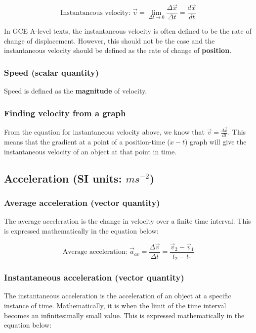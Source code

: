 \documentclass[11pt]{article}
\begin{document}
\[\text{Instantaneous velocity: } \vec{v} = \lim_{\Delta t \rightarrow 0} \frac{\Delta \vec{x}}{\Delta t} = \frac{d \vec{x}}{dt}\]

In GCE A-level texts, the instantaneous velocity is often defined to be the rate of change of displacement. However, this should not be the case and the instantaneous velocity should be defined as the rate of change of \textbf{position}.

\subsubsection{Speed (scalar quantity)}
\label{sec:org77fb81c}
Speed is defined as the \textbf{magnitude} of velocity.

\subsubsection{Finding velocity from a graph}
\label{sec:org76e28b6}
From the equation for instantaneous velocity above, we know that \(\vec{v} = \frac{d \vec{x}}{dt}\). This means that the gradient at a point of a position-time (\(x - t\)) graph will give the instantaneous velocity of an object at that point in time.


\subsection{Acceleration (SI units: \(\si{ms^{-2}}\))}
\label{sec:orgfcd9159}

\subsubsection{Average acceleration (vector quantity)}
\label{sec:orgf4588b1}
The average acceleration is the change in velocity over a finite time interval. This is expressed mathematically in the equation below:

\[\text{Average acceleration: } \vec{a}_{av} = \frac{\Delta \vec{v}}{\Delta t} = \frac{\vec{v}_2 - \vec{v}_1}{t_2 - t_1}\]

\subsubsection{Instantaneous acceleration (vector quantity)}
\label{sec:org1fff232}
The instantaneous acceleration is the acceleration of an object at a specific instance of time. Mathematically, it is when the limit of the time interval becomes an infinitesimally small value. This is expressed mathematically in the equation below:
\end{document}
